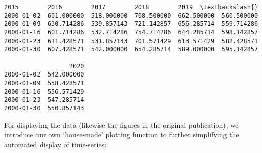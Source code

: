 \documentclass[11pt]{article}
\makeatletter
\newcommand{\boxspacing}{\kern\kvtcb@left@rule\kern\kvtcb@boxsep}
\newcommand{\prompt}[4]{
        \ttfamily\llap{{\color{#2}[#3]:\hspace{3pt}#4}}\vspace{-\baselineskip}
    }
\makeatother
\begin{document}
            \begin{tcolorbox}[breakable, size=fbox, boxrule=.5pt, pad at break*=1mm, opacityfill=0]
\prompt{Out}{outcolor}{39}{\boxspacing}
\begin{Verbatim}[commandchars=\\\{\}]
                  2015        2016        2017        2018        2019  \textbackslash{}
2000-01-02  601.000000  518.000000  708.500000  662.500000  560.500000
2000-01-09  630.714286  539.857143  721.142857  656.285714  559.714286
2000-01-16  601.714286  532.714286  754.714286  644.285714  598.142857
2000-01-23  611.428571  531.857143  701.571429  613.571429  582.428571
2000-01-30  607.428571  542.000000  654.285714  589.000000  595.142857

                  2020
2000-01-02  542.000000
2000-01-09  558.428571
2000-01-16  556.571429
2000-01-23  547.285714
2000-01-30  550.857143
\end{Verbatim}
\end{tcolorbox}
        
    For displaying the data (likewise the figures in the original
publication), we introduce our own `house-made' plotting function to
further simplifying the automated display of time-series:
\end{document}
